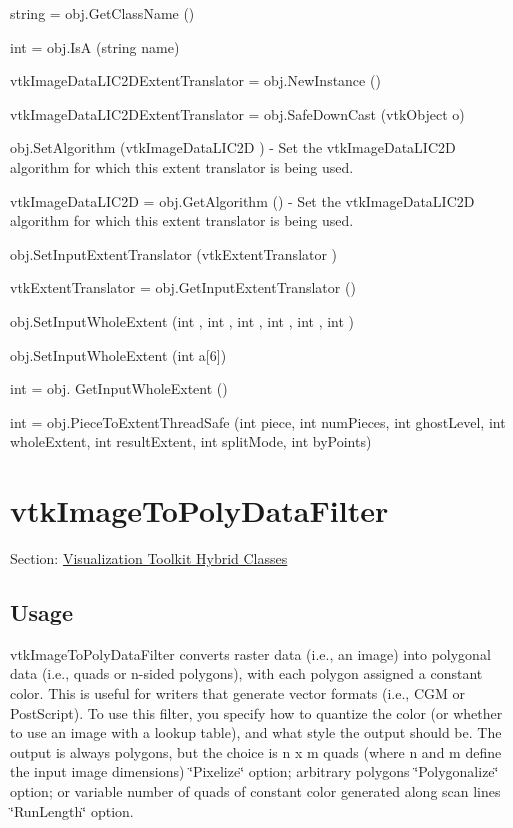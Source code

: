 \begin{DoxyItemize}
\item {\ttfamily string = obj.\-Get\-Class\-Name ()}  
\item {\ttfamily int = obj.\-Is\-A (string name)}  
\item {\ttfamily vtk\-Image\-Data\-L\-I\-C2\-D\-Extent\-Translator = obj.\-New\-Instance ()}  
\item {\ttfamily vtk\-Image\-Data\-L\-I\-C2\-D\-Extent\-Translator = obj.\-Safe\-Down\-Cast (vtk\-Object o)}  
\item {\ttfamily obj.\-Set\-Algorithm (vtk\-Image\-Data\-L\-I\-C2\-D )} -\/ Set the vtk\-Image\-Data\-L\-I\-C2\-D algorithm for which this extent translator is being used.  
\item {\ttfamily vtk\-Image\-Data\-L\-I\-C2\-D = obj.\-Get\-Algorithm ()} -\/ Set the vtk\-Image\-Data\-L\-I\-C2\-D algorithm for which this extent translator is being used.  
\item {\ttfamily obj.\-Set\-Input\-Extent\-Translator (vtk\-Extent\-Translator )}  
\item {\ttfamily vtk\-Extent\-Translator = obj.\-Get\-Input\-Extent\-Translator ()}  
\item {\ttfamily obj.\-Set\-Input\-Whole\-Extent (int , int , int , int , int , int )}  
\item {\ttfamily obj.\-Set\-Input\-Whole\-Extent (int a\mbox{[}6\mbox{]})}  
\item {\ttfamily int = obj. Get\-Input\-Whole\-Extent ()}  
\item {\ttfamily int = obj.\-Piece\-To\-Extent\-Thread\-Safe (int piece, int num\-Pieces, int ghost\-Level, int whole\-Extent, int result\-Extent, int split\-Mode, int by\-Points)}  
\end{DoxyItemize}\hypertarget{vtkhybrid_vtkimagetopolydatafilter}{}\section{vtk\-Image\-To\-Poly\-Data\-Filter}\label{vtkhybrid_vtkimagetopolydatafilter}
Section\-: \hyperlink{sec_vtkhybrid}{Visualization Toolkit Hybrid Classes} \hypertarget{vtkwidgets_vtkxyplotwidget_Usage}{}\subsection{Usage}\label{vtkwidgets_vtkxyplotwidget_Usage}
vtk\-Image\-To\-Poly\-Data\-Filter converts raster data (i.\-e., an image) into polygonal data (i.\-e., quads or n-\/sided polygons), with each polygon assigned a constant color. This is useful for writers that generate vector formats (i.\-e., C\-G\-M or Post\-Script). To use this filter, you specify how to quantize the color (or whether to use an image with a lookup table), and what style the output should be. The output is always polygons, but the choice is n x m quads (where n and m define the input image dimensions) \char`\"{}\-Pixelize\char`\"{} option; arbitrary polygons \char`\"{}\-Polygonalize\char`\"{} option; or variable number of quads of constant color generated along scan lines \char`\"{}\-Run\-Length\char`\"{} option.

